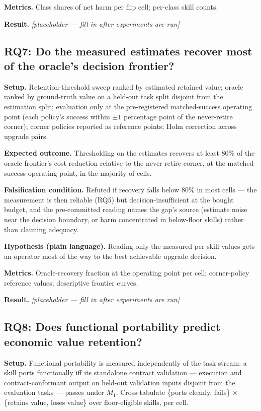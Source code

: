\documentclass[11pt]{article}
\newcommand{\resultplaceholder}{\textit{[placeholder --- fill in after experiments are run]}}
\begin{document}
\textbf{Metrics.} Class shares of net harm per flip cell; per-class skill counts.

\textbf{Result.} \resultplaceholder

\subsection{RQ7: Do the measured estimates recover most of the oracle's decision frontier?}

\textbf{Setup.} Retention-threshold sweep ranked by estimated retained value; oracle ranked by ground-truth value on a held-out task split disjoint from the estimation split; evaluation only at the pre-registered matched-success operating point (each policy's success within $\pm 1$ percentage point of the never-retire corner); corner policies reported as reference points; Holm correction across upgrade pairs.

\textbf{Expected outcome.} Thresholding on the estimates recovers at least 80\% of the oracle frontier's cost reduction relative to the never-retire corner, at the matched-success operating point, in the majority of cells.

\textbf{Falsification condition.} Refuted if recovery falls below 80\% in most cells --- the measurement is then reliable (RQ5) but decision-insufficient at the bought budget, and the pre-committed reading names the gap's source (estimate noise near the decision boundary, or harm concentrated in below-floor skills) rather than claiming adequacy.

\textbf{Hypothesis (plain language).} Reading only the measured per-skill values gets an operator most of the way to the best achievable upgrade decision.

\textbf{Metrics.} Oracle-recovery fraction at the operating point per cell; corner-policy reference values; descriptive frontier curves.

\textbf{Result.} \resultplaceholder

\subsection{RQ8: Does functional portability predict economic value retention?}

\textbf{Setup.} Functional portability is measured independently of the task stream: a skill ports functionally iff its standalone contract validation --- execution and contract-conformant output on held-out validation inputs disjoint from the evaluation tasks --- passes under $M_1$. Cross-tabulate \{ports cleanly, fails\} $\times$ \{retains value, loses value\} over floor-eligible skills, per cell.
\end{document}
